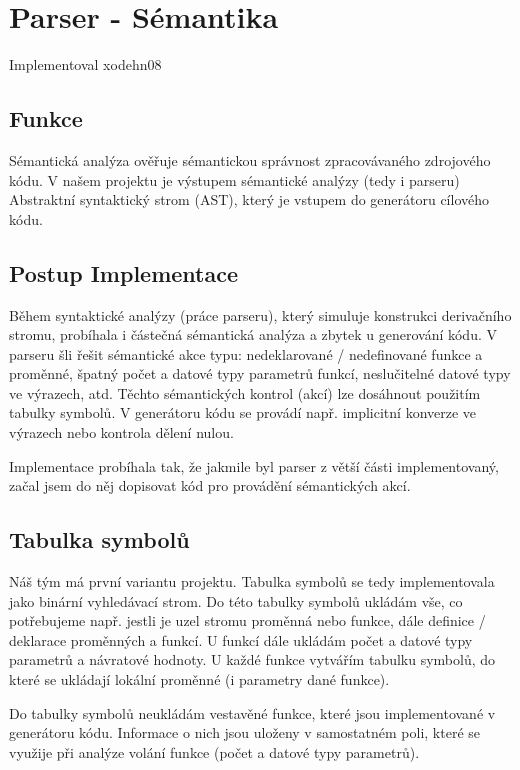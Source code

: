 \documentclass[11pt,a4paper]{article}
\begin{document}
    \newpage



\section{Parser - Sémantika} \label{semantika}
    Implementoval xodehn08

    \subsection{Funkce}
    Sémantická analýza ověřuje sémantickou správnost zpracovávaného zdrojového kódu. V našem projektu je výstupem sémantické analýzy (tedy i parseru) Abstraktní syntaktický strom (AST), který je vstupem do generátoru cílového kódu.

    \subsection{Postup Implementace}
    Během syntaktické analýzy (práce parseru), který simuluje konstrukci derivačního stromu, probíhala i částečná sémantická analýza a zbytek u generování kódu. V parseru šli řešit sémantické akce typu: nedeklarované / nedefinované funkce a proměnné, špatný počet a datové typy parametrů funkcí, neslučitelné datové typy ve výrazech, atd. Těchto sémantických kontrol (akcí) lze dosáhnout použitím tabulky symbolů. V generátoru kódu se provádí např. implicitní konverze ve výrazech nebo kontrola dělení nulou.

    Implementace probíhala tak, že jakmile byl parser z větší části implementovaný, začal jsem do něj dopisovat kód pro provádění sémantických akcí.

    \subsection{Tabulka symbolů}
    Náš tým má první variantu projektu. Tabulka symbolů se tedy implementovala jako binární vyhledávací strom. Do této tabulky symbolů ukládám vše, co potřebujeme např. jestli je uzel stromu proměnná nebo funkce, dále definice / deklarace proměnných a funkcí. U funkcí dále ukládám počet a datové typy parametrů a návratové hodnoty. U každé funkce vytvářím  tabulku symbolů, do které se ukládají lokální proměnné (i parametry dané funkce).

    Do tabulky symbolů neukládám vestavěné funkce, které jsou implementované v generátoru kódu. Informace o nich jsou uloženy v samostatném poli, které se využije při analýze volání funkce (počet a datové typy parametrů).
\end{document}
